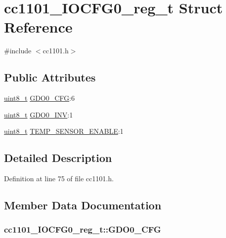 \hypertarget{structcc1101___i_o_c_f_g0__reg__t}{}\section{cc1101\+\_\+\+I\+O\+C\+F\+G0\+\_\+reg\+\_\+t Struct Reference}
\label{structcc1101___i_o_c_f_g0__reg__t}


{\ttfamily \#include $<$cc1101.\+h$>$}

\subsection*{Public Attributes}
\begin{DoxyCompactItemize}
\item 
\hyperlink{_p_e___types_8h_aba7bc1797add20fe3efdf37ced1182c5}{uint8\+\_\+t} \hyperlink{structcc1101___i_o_c_f_g0__reg__t_afe08a4823c73401f81c7e93e74452434}{G\+D\+O0\+\_\+\+C\+FG}\+:6
\item 
\hyperlink{_p_e___types_8h_aba7bc1797add20fe3efdf37ced1182c5}{uint8\+\_\+t} \hyperlink{structcc1101___i_o_c_f_g0__reg__t_a4bde9f877c42a94b958e322546fc10f2}{G\+D\+O0\+\_\+\+I\+NV}\+:1
\item 
\hyperlink{_p_e___types_8h_aba7bc1797add20fe3efdf37ced1182c5}{uint8\+\_\+t} \hyperlink{structcc1101___i_o_c_f_g0__reg__t_a9847aa32cc08da389456b7cfe9bc151b}{T\+E\+M\+P\+\_\+\+S\+E\+N\+S\+O\+R\+\_\+\+E\+N\+A\+B\+LE}\+:1
\end{DoxyCompactItemize}


\subsection{Detailed Description}


Definition at line 75 of file cc1101.\+h.



\subsection{Member Data Documentation}
\subsubsection[{\texorpdfstring{G\+D\+O0\+\_\+\+C\+FG}{GDO0_CFG}}]{ cc1101\+\_\+\+I\+O\+C\+F\+G0\+\_\+reg\+\_\+t\+::\+G\+D\+O0\+\_\+\+C\+FG}\hypertarget{structcc1101___i_o_c_f_g0__reg__t_afe08a4823c73401f81c7e93e74452434}{}\label{structcc1101___i_o_c_f_g0__reg__t_afe08a4823c73401f81c7e93e74452434}


